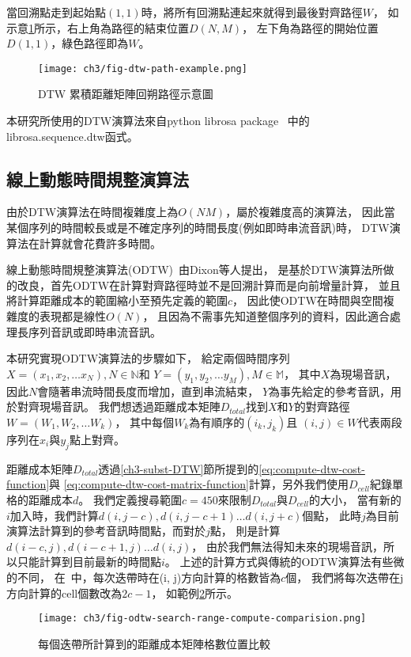 \documentclass[class=NCU_thesis, crop=false]{standalone}
\begin{document}
當回溯點走到起始點$(1, 1)$時，將所有回溯點連起來就得到最後對齊路徑$W$，
如示意\cref{fig:fig-ch3-dtw-path-example}所示，右上角為路徑的結束位置$D(N, M)$，
左下角為路徑的開始位置$D(1, 1)$，綠色路徑即為$W$。
\begin{figure}[!hbt]
    \centering
    \texttt{[image: ch3/fig-dtw-path-example.png]}
    \caption{DTW 累積距離矩陣回朔路徑示意圖}
    \label{fig:fig-ch3-dtw-path-example}
\end{figure}

本研究所使用的DTW演算法來自python librosa package~\cite{McFee2024librosa}
中的librosa.sequence.dtw函式。

\subsection{線上動態時間規整演算法} \label{ch3-subst-ODTW}
由於DTW演算法在時間複雜度上為$O(NM)$，屬於複雜度高的演算法，
因此當某個序列的時間較長或是不確定序列的時間長度(例如即時串流音訊)時，
DTW演算法在計算就會花費許多時間。

線上動態時間規整演算法(ODTW)~\cite{dixon2005ODTW}由Dixon等人提出，
是基於DTW演算法所做的改良，首先ODTW在計算對齊路徑時並不是回溯計算而是向前增量計算，
並且將計算距離成本的範圍縮小至預先定義的範圍$c$，
因此使ODTW在時間與空間複雜度的表現都是線性$O(N)$，
且因為不需事先知道整個序列的資料，因此適合處理長序列音訊或即時串流音訊。

本研究實現ODTW演算法的步驟如下，
給定兩個時間序列
$X = (x_1, x_2, \dots x_N), N \in \mathbb{N}$和
$Y = (y_1, y_2, \dots y_M), M \in \mathbb{M}$，
其中$X$為現場音訊，因此$N$會隨著串流時間長度而增加，直到串流結束，
$Y$為事先給定的參考音訊，用於對齊現場音訊。
我們想透過距離成本矩陣$D_{total}$找到$X$和$Y$的對齊路徑$W = (W_1, W_2, \dots W_k)$，
其中每個$W_k$為有順序的$(i_k,j_k)$且
$(i,j) \in W$代表兩段序列在$x_i$與$y_j$點上對齊。

距離成本矩陣$D_{total}$透過\ref{ch3-subst-DTW}節所提到的\cref{eq:compute-dtw-cost-function}與
\cref{eq:compute-dtw-cost-matrix-function}計算，另外我們使用$D_{cell}$紀錄單格的距離成本$d$。
我們定義搜尋範圍$c=450$來限制$D_{total}$與$D_{cell}$的大小，
當有新的$i$加入時，我們計算$d(i, j-c), d(i, j-c+1) \dots d(i, j+c)$個點，
此時$j$為目前演算法計算到的參考音訊時間點，而對於$j$點，
則是計算$d(i-c, j), d(i-c+1, j) \dots d(i, j)$，
由於我們無法得知未來的現場音訊，所以只能計算到目前最新的時間點$i$。
上述的計算方式與傳統的ODTW演算法有些微的不同，
在~\cite{dixon2005ODTW}中，每次迭帶時在(i, j)方向計算的格數皆為$c$個，
我們將每次迭帶在j方向計算的cell個數改為$2c-1$，
如範例\cref{fig:fig-ch3-odtw-search-range-compute-comparision}所示。
\begin{figure}[!hbt]
    \centering
    \texttt{[image: ch3/fig-odtw-search-range-compute-comparision.png]}
    \caption{每個迭帶所計算到的距離成本矩陣格數位置比較}
    \label{fig:fig-ch3-odtw-search-range-compute-comparision}
\end{figure}
\end{document}
